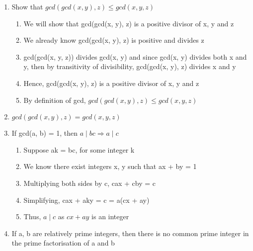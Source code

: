 \documentclass{article}
\begin{document}
\begin{enumerate}
\item Show that $ gcd(gcd(x, y), z) \leq gcd(x, y, z) $
\begin{enumerate}
\item We will show that gcd(gcd(x, y), z) is a positive divisor of x, y and z
\item We already know gcd(gcd(x, y), z) is positive and divides z
\item gcd(gcd(x, y, z)) divides gcd(x, y) and since gcd(x, y) divides both x and
y, then by transitivity of divisibility, gcd(gcd(x, y), z) divides x and y
\item Hence, gcd(gcd(x, y), z) is a positive divisor of x, y and z
\item By definition of gcd, $ gcd(gcd(x, y), z) \leq gcd(x, y, z) $
\end{enumerate}

\item $ gcd(gcd(x, y), z) = gcd(x, y, z) $

\item If gcd(a, b) = 1, then $ a \mid bc \Rightarrow a \mid c $
\begin{enumerate}
\item Suppose ak = bc, for some integer k
\item We know there exist integers x, y such that ax + by = 1
\item Multiplying both sides by c, cax + cby = c
\item Simplifying, cax + aky = c = a(cx + ay)
\item Thus, $ a \mid c $ as $ cx + ay $ is an integer 
\end{enumerate}

\item If a, b are relatively prime integers, then there is no common prime
integer in the prime factorisation of a and b

\end{enumerate}
\end{document}
